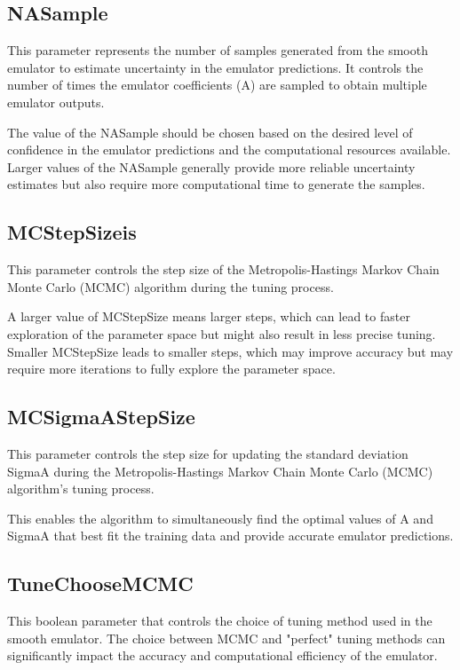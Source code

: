\documentclass[12pt]{article}
\numberwithin{equation}{section}
\numberwithin{figure}{section}
\begin{document}
\subsection{NASample}

This parameter represents the number of samples generated from the smooth emulator to estimate uncertainty in the emulator predictions. It controls the number of times the emulator coefficients (A) are sampled to obtain multiple emulator outputs.

The value of the NASample should be chosen based on the desired level of confidence in the emulator predictions and the computational resources available. Larger values of the NASample generally provide more reliable uncertainty estimates but also require more computational time to generate the samples.  


\subsection{MCStepSizeis}
 This parameter controls the step size of the Metropolis-Hastings Markov Chain Monte Carlo (MCMC) algorithm during the tuning process.
 
A larger value of MCStepSize means larger steps, which can lead to faster exploration of the parameter space but might also result in less precise tuning. Smaller MCStepSize leads to smaller steps, which may improve accuracy but may require more iterations to fully explore the parameter space.

\subsection{MCSigmaAStepSize}
 This parameter controls the step size for updating the standard deviation SigmaA during the Metropolis-Hastings Markov Chain Monte Carlo (MCMC) algorithm's tuning process. 

This enables the algorithm to simultaneously find the optimal values of A and SigmaA that best fit the training data and provide accurate emulator predictions.


 
\subsection{TuneChooseMCMC}

This boolean parameter that controls the choice of tuning method used in the smooth emulator. The choice between MCMC and "perfect" tuning methods can significantly impact the accuracy and computational efficiency of the emulator.
\end{document}
